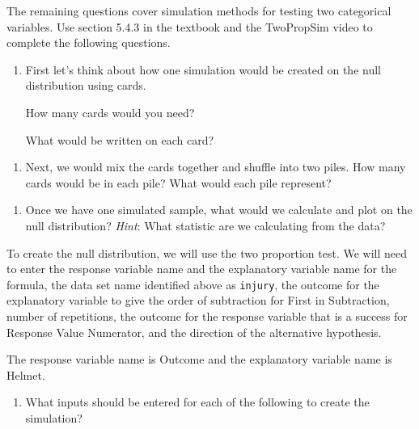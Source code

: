 \documentclass[
]{report}
\providecommand{\tightlist}{%
  \setlength{\itemsep}{0pt}\setlength{\parskip}{0pt}}
\begin{document}
The remaining questions cover simulation methods for testing two categorical variables. Use section 5.4.3 in the textbook and the TwoPropSim video to complete the following questions.

\begin{enumerate}
\def\labelenumi{\arabic{enumi}.}
\item
  First let's think about how one simulation would be created on the null distribution using cards.

  How many cards would you need?
  \vspace{0.1in}

  What would be written on each card?
\end{enumerate}

\vspace{0.5in}

\begin{enumerate}
\def\labelenumi{\arabic{enumi}.}
\setcounter{enumi}{1}
\tightlist
\item
  Next, we would mix the cards together and shuffle into two piles. How many cards would be in each pile? What would each pile represent?
\end{enumerate}

\vspace{1in}

\begin{enumerate}
\def\labelenumi{\arabic{enumi}.}
\setcounter{enumi}{2}
\tightlist
\item
  Once we have one simulated sample, what would we calculate and plot on the null distribution? \emph{Hint}: What statistic are we calculating from the data?
\end{enumerate}

\vspace{1in}

To create the null distribution, we will use the two proportion test. We will need to enter the response variable name and the explanatory variable name for the formula, the data set name identified above as \texttt{injury}, the outcome for the explanatory variable to give the order of subtraction for First in Subtraction, number of repetitions, the outcome for the response variable that is a success for Response Value Numerator, and the direction of the alternative hypothesis.

The response variable name is Outcome and the explanatory variable name is Helmet.

\newpage

\begin{enumerate}
\def\labelenumi{\arabic{enumi}.}
\setcounter{enumi}{3}
\tightlist
\item
  What inputs should be entered for each of the following to create the simulation?
\end{enumerate}
\end{document}
